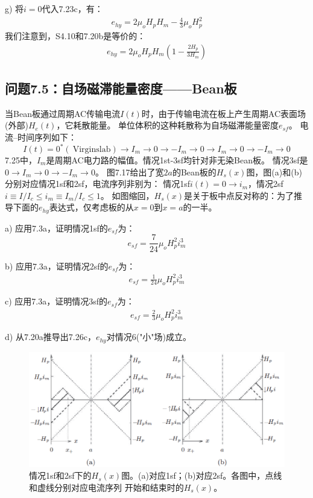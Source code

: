 g) 将$i=0$代入7.23c，有：
\begin{align*}%
e_{hy}=2\mu_oH_pH_m-\frac{4}{3}\mu_oH_{p}^{2} \tag{S4.10}
\end{align*}
我们注意到，S4.10和7.20b是等价的：
\begin{align*}%
e_{hy}=2\mu_oH_pH_m\left(1-\frac{2H_p}{3H_m}\right) \tag{7.20b}
\end{align*}


\subsection{问题7.5：自场磁滞能量密度——Bean板}
当Bean板通过周期AC传输电流$I(t)$时，由于传输电流在板上产生周期AC表面场(外部)$H_e(t)$，它耗散能量。
单位体积的这种耗散称为自场磁滞能量密度$e_{sf}$。 电流--时间序列如下：
\begin{equation}%
I(t)=0^*(\ \mathrm{Virgin slab})\rightarrow I_m\rightarrow 0\rightarrow -I_m\rightarrow 0\rightarrow I_m\rightarrow 0\rightarrow -I_m\rightarrow 0
\end{equation}
7.25中，$I_m$是周期AC电力路的幅值。情况1st-3sf均针对非$无染$Bean板。
情况3sf是$0\rightarrow I_m\rightarrow 0\rightarrow -I_m\rightarrow 0$。
图7.17给出了宽$2a$的Bean板的$H_s(x)$图，图(a)和(b)分别对应情况1sf和2sf，电流序列非别为：
情况1sf$i(t)=0\rightarrow i_m$，情况2sf$i\equiv I/I_c\le i_m\equiv I_m/I_c\le 1$。
如图缩回，$H_s(x)$是关于板中点反对称的：为了推导下面的$e_{hy}$表达式，仅考虑板的从$x=0$到$x=a$的一半。

a) 应用7.3a，证明情况1sf的$e_{sf}$为：
\begin{equation}%
e_{sf}=\frac{7}{24}\mu_oH_{p}^{2}i_{m}^{3}
\end{equation}

b) 应用7.3a，证明情况2sf的$e_{sf}$为：
\begin{align*}%
e_{sf}=\frac{1}{24}\mu_oH_{p}^{2}i_{m}^{3} \tag{7.26b}
\end{align*}

c) 应用7.3a，证明情况3sf的$e_{sf}$为：
\begin{align*}%
e_{sf}=\frac{2}{3}\mu_oH_{p}^{2}i_{m}^{3} \tag{7.26c}
\end{align*}

d) 从7.20a推导出7.26c，$e_{hy}$对情况6("小"场)成立。
\begin{figure}[htbp]
	\centering
	\includegraphics[scale=0.7]{chpt7/figs/fig7.17.eps}
	\caption{情况1sf和2sf下的$H_s(x)$图。(a)对应1sf；(b)对应2sf。各图中，点线和虚线分别对应电流序列
		开始和结束时的$H_s(x)$。}
\end{figure}


